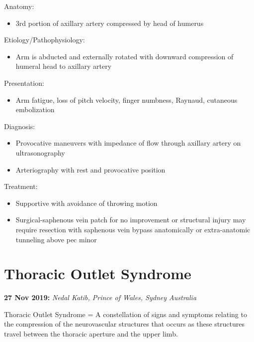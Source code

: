 \documentclass[
]{book}
\providecommand{\tightlist}{%
  \setlength{\itemsep}{0pt}\setlength{\parskip}{0pt}}
\begin{document}
Anatomy:

\begin{itemize}
\tightlist
\item
  3rd portion of axillary artery compressed by head of humerus
\end{itemize}

Etiology/Pathophysiology:

\begin{itemize}
\tightlist
\item
  Arm is abducted and externally rotated with downward compression of
  humeral head to axillary artery
\end{itemize}

Presentation:

\begin{itemize}
\tightlist
\item
  Arm fatigue, loss of pitch velocity, finger numbness, Raynaud,
  cutaneous embolization
\end{itemize}

Diagnosis:

\begin{itemize}
\item
  Provocative maneuvers with impedance of flow through axillary artery
  on ultrasonography
\item
  Arteriography with rest and provocative position
\end{itemize}

Treatment:

\begin{itemize}
\item
  Supportive with avoidance of throwing motion
\item
  Surgical-saphenous vein patch for no improvement or structural
  injury may require resection with saphenous vein bypass anatomically
  or extra-anatomic tunneling above pec minor
\end{itemize}

\hypertarget{thoracic-outlet-syndrome}{%
\section{Thoracic Outlet Syndrome}\label{thoracic-outlet-syndrome}}

\textbf{27 Nov 2019:} \emph{Nedal Katib, Prince of Wales, Sydney Australia}

Thoracic Outlet Syndrome = A constellation of signs and symptoms
relating to the compression of the neurovascular structures that occurs
as these structures travel between the thoracic aperture and the upper
limb.
\end{document}
